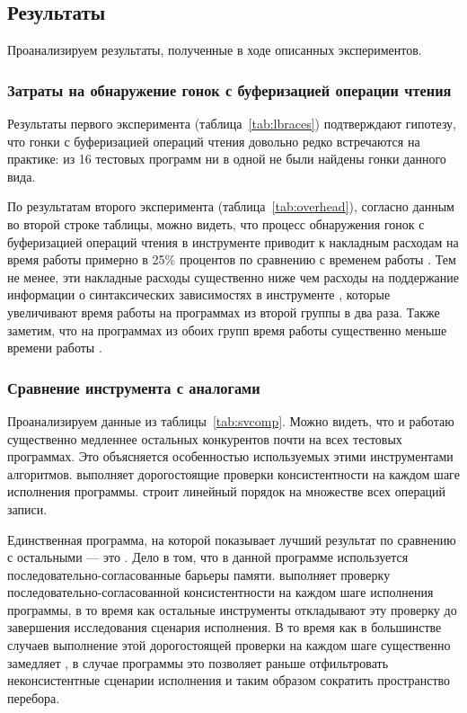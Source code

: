 

\subsection*{Результаты}

Проанализируем результаты, полученные в ходе описанных экспериментов.

\subsubsection*{Затраты на обнаружение гонок с буферизацией операции чтения}

Результаты первого эксперимента (таблица~\ref{tab:lbraces})
подтверждают гипотезу, что гонки с буферизацией операций чтения 
довольно редко встречаются на практике: 
из 16 тестовых программ ни в одной не были найдены гонки данного вида.

По результатам второго эксперимента (таблица~\ref{tab:overhead}), 
согласно данным во второй строке таблицы, можно видеть, что
процесс обнаружения гонок с буферизацией операций чтения 
в инструменте \wmc приводит к накладным расходам на время работы 
примерно в 25\% процентов по сравнению с временем работы \genmc.
Тем не менее, эти накладные расходы существенно ниже чем 
расходы на поддержание информации о синтаксических зависимостях
в инструменте \hmc, которые увеличивают время работы \hmc
на программах из второй группы в два раза.  
Также заметим, что на программах из обоих групп
время работы \wmc существенно меньше времени работы \hmc. 

\subsubsection*{Сравнение инструмента \wmc с аналогами}

Проанализируем данные из таблицы~\ref{tab:svcomp}. 
Можно видеть, что \Nidhugg и \rmem работаю существенно медленнее остальных 
конкурентов почти на всех тестовых программах. 
Это объясняется особенностью используемых этими инструментами алгоритмов.
\Nidhugg выполняет дорогостоящие проверки консистентности
на каждом шаге исполнения программы.
\rmem строит линейный порядок на множестве всех операций записи.

Единственная программа, на которой \Nidhugg показывает 
лучший результат по сравнению с остальными --- это .
Дело в том, что в данной программе используется 
последовательно-согласованные барьеры памяти.
\Nidhugg выполняет проверку последовательно-согласованной
консистентности на каждом шаге исполнения программы, в то время 
как остальные инструменты откладывают эту проверку 
до завершения исследования сценария исполнения. 
В то время как в большинстве случаев выполнение этой дорогостоящей проверки 
на каждом шаге существенно замедляет \Nidhugg, 
в случае программы  это позволяет 
раньше отфильтровать неконсистентные сценарии исполнения 
и таким образом сократить пространство перебора. 

